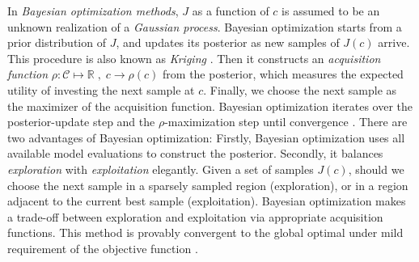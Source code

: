 \documentclass[a4paper,onecolumn]{article}
\theoremstyle{remark}
\begin{document}
\noindent In \emph{Bayesian optimization methods}, $J$ as a function of $c$
is assumed to be an unknown realization of a \emph{Gaussian process}. 
Bayesian optimization starts from a prior distribution of $J$, and
updates its posterior as new samples of $J(c)$ arrive. This procedure is also known as
\emph{Kriging} \cite{Krigingold, kriging}.
Then it constructs an \emph{acquisition function} $\rho: \mathcal{C}\mapsto \mathbb{R}\;
,\; c\rightarrow \rho(c)$ from the posterior, which measures
the expected utility of investing the next sample at $c$.
Finally, we choose the next sample as the maximizer of the acquisition function.
Bayesian optimization iterates over the posterior-update step and the 
$\rho$-maximization step until convergence \cite{Mockus Bayesian opt, practicalBayesianopt}.
There are two advantages of Bayesian optimization:
Firstly, Bayesian optimization uses all available model evaluations
to construct the posterior. Secondly, it balances \emph{exploration}
with \emph{exploitation} elegantly.
Given a set of samples $J(c)$, should we choose the next sample 
in a sparsely sampled region (exploration),
or in a region adjacent to the current best sample (exploitation).
Bayesian optimization makes a trade-off between exploration and exploitation 
via appropriate acquisition functions. This method is provably convergent
to the global optimal under mild requirement of the objective function 
\cite{Bayopt converge 2, convergenceBayesian}.
\\
\end{document}
